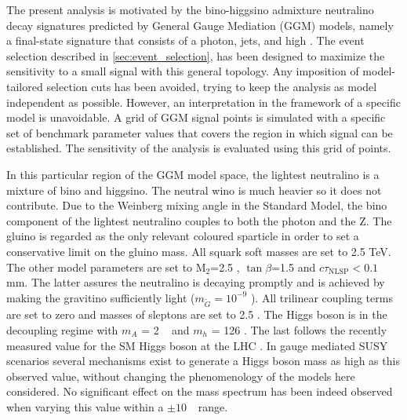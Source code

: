 
The present analysis is motivated by the bino-higgsino admixture neutralino decay signatures predicted by General Gauge Mediation (GGM) models,
namely a final-state signature that consists of a photon, jets, and high \MET. The event selection described in \Sec \ref{sec:event_selection},
has been designed to maximize the sensitivity to a small signal with this general topology. Any imposition of model-tailored selection cuts has been
avoided, trying to keep the analysis as model independent as possible. However, an interpretation in the framework of a specific model is unavoidable.
A grid of GGM signal points is simulated with a specific set of benchmark parameter values that covers the region in which signal can be established.
The sensitivity of the analysis is evaluated using this grid of points.

In this particular region of the GGM model space, the lightest neutralino is a mixture of bino and higgsino. The neutral wino is much heavier so it
does not contribute. Due to the Weinberg mixing angle in the Standard Model, the bino component of the lightest neutralino couples to both the photon and the Z.
The gluino is regarded as the only relevant coloured sparticle in order to set a conservative limit on the gluino mass. All squark soft masses are set to 2.5 TeV.
The other model parameters are set to M$_2$=2.5 \tev, $\tan\beta$=1.5 and $c\tau_{\mathrm{NLSP}} < 0.1$ mm. The latter assures the neutralino is decaying promptly
and is achieved by making the gravitino sufficiently light ($m_{\tilde{G}}=10^{-9}$ \gev). All trilinear coupling terms are set to zero and masses of sleptons
are set to 2.5 \tev. The Higgs boson is in the decoupling regime with $m_{A}$ = 2 \tev~ and $m_{h}$ = 126 \gev. The last follows the recently measured value
for the SM Higgs boson at the LHC \cite{ATLAS-CONF-2013-014,CMS-PAS-HIG-14-009}. In gauge mediated SUSY scenarios several mechanisms exist \cite{Craig:2011yk,Auzzi:2011eu,Csaki:2012fh,Larsen:2012rq,Craig:2012hc}
to generate a Higgs boson mass as high as this observed value, without changing the phenomenology of the models here considered. No significant effect on the mass spectrum
has been indeed observed when varying this value within a $\pm 10~$ \gev\ range.

